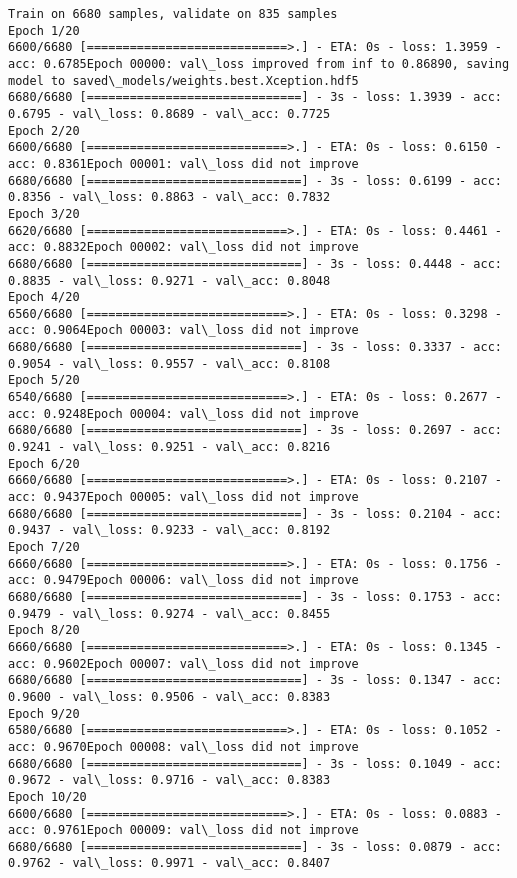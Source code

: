 \documentclass[11pt]{article}
\begin{document}
    \begin{Verbatim}[commandchars=\\\{\}]
Train on 6680 samples, validate on 835 samples
Epoch 1/20
6600/6680 [============================>.] - ETA: 0s - loss: 1.3959 - acc: 0.6785Epoch 00000: val\_loss improved from inf to 0.86890, saving model to saved\_models/weights.best.Xception.hdf5
6680/6680 [==============================] - 3s - loss: 1.3939 - acc: 0.6795 - val\_loss: 0.8689 - val\_acc: 0.7725
Epoch 2/20
6600/6680 [============================>.] - ETA: 0s - loss: 0.6150 - acc: 0.8361Epoch 00001: val\_loss did not improve
6680/6680 [==============================] - 3s - loss: 0.6199 - acc: 0.8356 - val\_loss: 0.8863 - val\_acc: 0.7832
Epoch 3/20
6620/6680 [============================>.] - ETA: 0s - loss: 0.4461 - acc: 0.8832Epoch 00002: val\_loss did not improve
6680/6680 [==============================] - 3s - loss: 0.4448 - acc: 0.8835 - val\_loss: 0.9271 - val\_acc: 0.8048
Epoch 4/20
6560/6680 [============================>.] - ETA: 0s - loss: 0.3298 - acc: 0.9064Epoch 00003: val\_loss did not improve
6680/6680 [==============================] - 3s - loss: 0.3337 - acc: 0.9054 - val\_loss: 0.9557 - val\_acc: 0.8108
Epoch 5/20
6540/6680 [============================>.] - ETA: 0s - loss: 0.2677 - acc: 0.9248Epoch 00004: val\_loss did not improve
6680/6680 [==============================] - 3s - loss: 0.2697 - acc: 0.9241 - val\_loss: 0.9251 - val\_acc: 0.8216
Epoch 6/20
6660/6680 [============================>.] - ETA: 0s - loss: 0.2107 - acc: 0.9437Epoch 00005: val\_loss did not improve
6680/6680 [==============================] - 3s - loss: 0.2104 - acc: 0.9437 - val\_loss: 0.9233 - val\_acc: 0.8192
Epoch 7/20
6660/6680 [============================>.] - ETA: 0s - loss: 0.1756 - acc: 0.9479Epoch 00006: val\_loss did not improve
6680/6680 [==============================] - 3s - loss: 0.1753 - acc: 0.9479 - val\_loss: 0.9274 - val\_acc: 0.8455
Epoch 8/20
6660/6680 [============================>.] - ETA: 0s - loss: 0.1345 - acc: 0.9602Epoch 00007: val\_loss did not improve
6680/6680 [==============================] - 3s - loss: 0.1347 - acc: 0.9600 - val\_loss: 0.9506 - val\_acc: 0.8383
Epoch 9/20
6580/6680 [============================>.] - ETA: 0s - loss: 0.1052 - acc: 0.9670Epoch 00008: val\_loss did not improve
6680/6680 [==============================] - 3s - loss: 0.1049 - acc: 0.9672 - val\_loss: 0.9716 - val\_acc: 0.8383
Epoch 10/20
6600/6680 [============================>.] - ETA: 0s - loss: 0.0883 - acc: 0.9761Epoch 00009: val\_loss did not improve
6680/6680 [==============================] - 3s - loss: 0.0879 - acc: 0.9762 - val\_loss: 0.9971 - val\_acc: 0.8407

\end{Verbatim}
\end{document}
